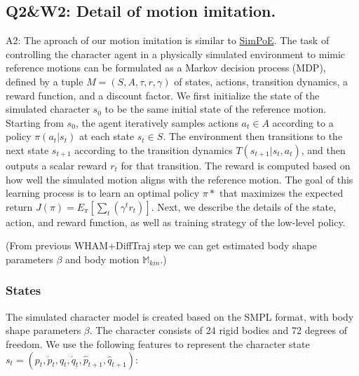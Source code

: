 \documentclass{article}
\begin{document}
\subsection{Q2\&W2: Detail of motion imitation.}\label{q2w2-detail-of-motion-imitation.}

A2: The aproach of our motion imitation is similar to \href{https://arxiv.org/abs/2104.00683}{SimPoE}. The task of controlling the character agent in a physically simulated environment to mimic reference motions can be formulated as a Markov decision process (MDP), defined by a tuple $M=(S,A,\tau,r,\gamma)$ of states, actions, transition dynamics, a reward function, and a discount factor. We first initialize the state of the simulated character $s_0$ to be the same initial state of the reference motion. Starting from $s_0$, the agent iteratively samples actions $a_t \in A$ according to a policy $\pi(a_t | s_t)$ at each state $s_t \in S$. The environment then transitions to the next state $s_{t+1}$ according to the transition dynamics $T(s_{t+1} | s_t, a_t)$, and then outputs a scalar reward $r_t$ for that transition. The reward is computed based on how well the simulated motion aligns with the reference motion. The goal of this learning process is to learn an optimal policy $\pi*$ that maximizes the expected return $J(\pi) = E_\pi[\sum_t(\gamma^tr_t)]$. Next, we describe the details of the state, action, and reward function, as well as training strategy of the low-level policy.

(From previous WHAM+DiffTraj step we can get estimated body shape parameters $\beta$ and body motion $\mathbb{M}_{kin}$.)

\subsubsection{States}\label{states}

The simulated character model is created based on the SMPL format, with body shape parameters $\beta$. The character consists of 24 rigid bodies and 72 degrees of freedom. We use the following features to represent the character state $s_t = (p_t, \dot{p}_t, q_t, \dot{q}_t, \hat{p}_{t+1}, \hat{q}_{t+1})$:

\end{document}

